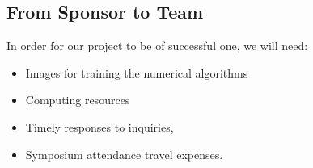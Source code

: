 \documentclass[12pt,letterpaper]{article}
\theoremstyle{definition}
\begin{document}
\subsection{From Sponsor to Team} %

In order for our project to be of successful one, we will need:
\begin{itemize}
    \item Images for training the numerical algorithms
    \item Computing resources
    \item Timely responses to inquiries, 
    \item Symposium attendance travel expenses.
\end{itemize}


%
%
\end{document}
